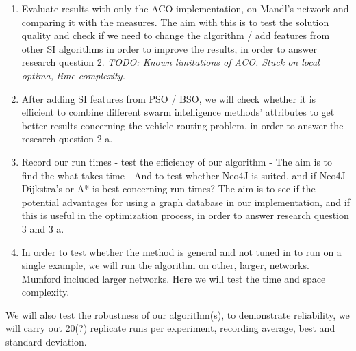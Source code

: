 \begin{enumerate}

\item Evaluate results with only the ACO implementation, on Mandl's network and comparing it with the measures.  
The aim with this is to test the solution quality and check if we need to change the algorithm / add features from other SI algorithms in order to improve the results, in order to answer research question 2. \emph{\color{red} TODO: Known limitations of ACO. Stuck on local optima, time complexity.}

\item After adding SI features from PSO / BSO, we will check whether it is efficient to combine different swarm intelligence methods' attributes to get better results concerning the vehicle routing problem, in order to answer the research question 2 a.

\item Record our run times - test the efficiency of our algorithm - The aim is to find the what takes time - And to test whether Neo4J is suited, and if Neo4J Dijkstra's or A* is best concerning run times? The aim is to see if the potential advantages for using a graph database in our implementation, and if this is useful in the optimization process, in order to answer research question 3 and 3 a.

\item In order to test whether the method is general and not tuned in to run on a single example, we will run the algorithm on other, larger, networks. Mumford included larger networks. Here we will test the time and space complexity.

\end{enumerate}

We will also test the robustness of our algorithm(s), to demonstrate reliability, we will carry out 20(?) replicate runs per experiment, recording average, best and standard deviation. 


